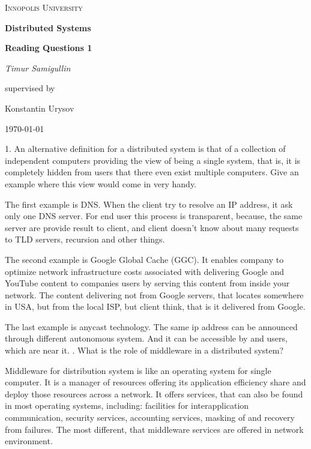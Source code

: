 \documentclass[12pt,a4paper]{report}
\begin{document}
\begin{titlepage}
	\centering
	{\scshape\LARGE Innopolis University \par}
	\vspace{1cm}
	{\huge\bfseries Distributed Systems\par}
	{\huge\bfseries Reading Questions 1\par}
	\vspace{2cm}
	{\Large\itshape Timur Samigullin\par}
	\vfill
	supervised by\par
	Konstantin Urysov
	\vfill
	{\large \today\par}
\end{titlepage}

1. An alternative definition for a distributed system is that of a collection of independent computers providing the view of being a single system, that is, it is completely hidden from users that there even exist multiple computers. Give an example where this view would come in very handy.

The first example is DNS. When the client try to resolve an IP address, it ask only one DNS server. For end user this process is transparent, because, the same server are provide result to client, and client doesn't know about many requests to TLD servers, recursion and other things.

The second example is Google Global Cache (GGC). It enables company to optimize network infrastructure costs associated with delivering Google and YouTube content to companies users by serving this content from inside your network. The content delivering not from Google servers, that locates somewhere in USA, but from the local ISP, but client think, that is it delivered from Google.

The last example is anycast technology. The same ip address can be announced through different autonomous system. And it can be accessible by and users, which are near it.
. What is the role of middleware in a distributed system?

Middleware for distribution system is like an operating system for single computer. It is a manager of resources offering its application efficiency share and deploy those resources across a network. It offers services, that can also be found in most operating systems, including: facilities for interapplication communication, security services, accounting services, masking of and recovery from failures. The most different, that middleware services are offered in network environment.
\end{document}
